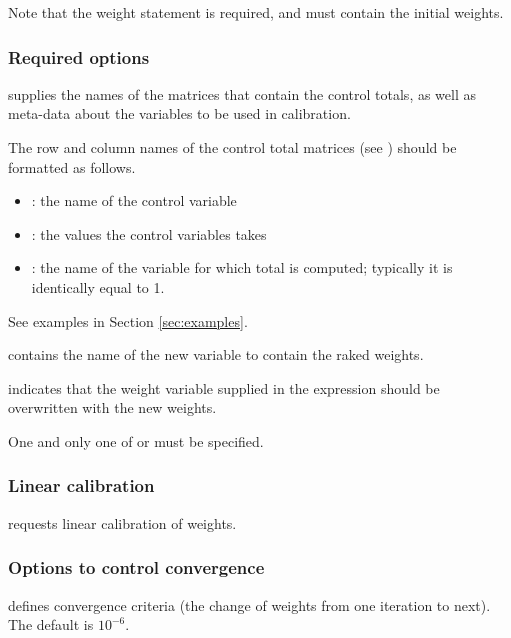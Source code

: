 \hangpara
Note that the weight statement \stcmd{[pw=\varname]} is required, and must contain the initial weights.

\subsubsection{Required options}

\hangpara
{} \RB\stcmd{)}
supplies the names of the matrices that contain the control
totals, as well as meta-data about the variables to be used
in calibration.

\begin{sttech}
The row and column names of the control total matrices
(see ) should be formatted as follows.
\begin{itemize}
    \item {}: the name of the control variable
    \item {}: the values the control variables takes
    \item {}: the name of the variable for which total is computed;
          typically it is identically equal to 1.
\end{itemize}
See examples in Section \ref{sec:examples}.
\end{sttech}

\hangpara
{}
contains the name of the new variable to contain the raked weights.

\hangpara
{} indicates that the weight variable supplied in the
\stcmd{[pw=\varname]} expression should be overwritten with the new weights.

One and only one of  or  must be specified.

\subsubsection{Linear calibration}

\hangpara
{}
requests linear calibration of weights.

\subsubsection{Options to control convergence}

\hangpara
{} defines convergence criteria
(the change of weights from one iteration to next). The default is $10^{-6}$.

